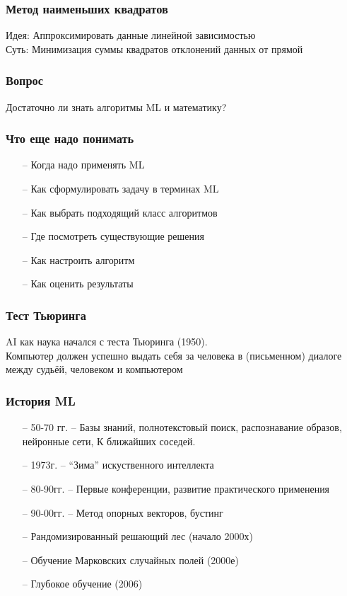 \documentclass[12pt]{beamer}
\begin{document}
\begin{frame}\frametitle{Метод наименьших квадратов}
Идея: Аппроксимировать данные линейной зависимостью \\
Суть: Минимизация суммы квадратов отклонений данных от прямой\\
\end{frame}

\begin{frame}\frametitle{Вопрос}
    Достаточно ли знать алгоритмы ML и математику?
\end{frame}

\begin{frame}\frametitle{Что еще надо понимать}

\begin{itemize}
  \item[--] Когда надо применять ML
  \item[--] Как сформулировать задачу в терминах ML
  \item[--] Как выбрать подходящий класс алгоритмов
  \item[--] Где посмотреть существующие решения
  \item[--] Как настроить алгоритм
  \item[--] Как оценить результаты
\end{itemize}
\end{frame}


\begin{frame}\frametitle{Тест Тьюринга}
    AI как наука начался с теста Тьюринга (1950).\\
    \vspace{5mm}
    Компьютер должен успешно выдать себя за человека в (письменном) диалоге между судьёй, человеком и компьютером
\end{frame}

\begin{frame}\frametitle{История ML}
\begin{itemize}
  \item[--] 50-70 гг. -- Базы знаний, полнотекстовый поиск, распознавание образов, нейронные сети, К ближайших соседей.
  \item[--] 1973г. -- “Зима” искуственного интеллекта
  \item[--] 80-90гг.  -- Первые конференции, развитие практического применения
  \item[--] 90-00гг. -- Метод опорных векторов, бустинг
  \item[--] Рандомизированный решающий лес (начало 2000х)
  \item[--] Обучение Марковских случайных полей (2000е)
  \item[--] Глубокое обучение (2006)
\end{itemize}
\end{frame}
\end{document}
